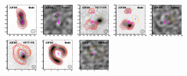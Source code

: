 \documentclass[iop]{emulateapj}
\begin{document}
\begin{figure}[!tbp]
\begin{centering}
\includegraphics[width=0.162\textwidth]{../Figures/modelfit/ADFS05_model_bestfit.pdf}
\includegraphics[width=0.162\textwidth]{../Figures/modelfit/ADFS05_residual_bestfit.pdf}
\includegraphics[width=0.162\textwidth]{../Figures/modelfit/ADFS06_optical_bestfit.pdf}
\includegraphics[width=0.162\textwidth]{../Figures/modelfit/ADFS06_model_bestfit.pdf}
\includegraphics[width=0.162\textwidth]{../Figures/modelfit/ADFS06_residual_bestfit.pdf}
\includegraphics[width=0.162\textwidth]{../Figures/modelfit/ADFS07_optical_bestfit.pdf}
\includegraphics[width=0.162\textwidth]{../Figures/modelfit/ADFS07_model_bestfit.pdf}
\includegraphics[width=0.162\textwidth]{../Figures/modelfit/ADFS07_residual_bestfit.pdf}

\end{centering}
\end{figure}
\end{document}
